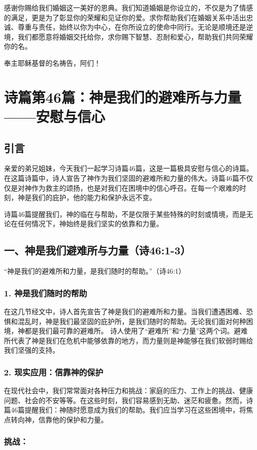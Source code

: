 \documentclass[a4paper, 12pt]{article}
\begin{document}
感谢你赐给我们婚姻这一美好的恩典。我们知道婚姻是你设立的，不仅是为了情感的满足，更是为了彰显你的荣耀和见证你的爱。求你帮助我们在婚姻关系中活出忠诚、尊重与责任，始终以你为中心，在你所设立的使命中同行。无论是顺境还是逆境，我们都愿意将婚姻交托给你，求你赐下智慧、忍耐和爱心，帮助我们共同荣耀你的名。

奉主耶稣基督的名祷告，阿们！
\newpage
\section{诗篇第46篇：神是我们的避难所与力量——安慰与信心}
\subsection*{引言}
\hspace{0.6cm}亲爱的弟兄姐妹，今天我们一起学习诗篇46篇，这是一篇极具安慰与信心的诗篇。在这篇诗篇中，诗人宣告了神作为我们坚固的避难所和力量的伟大。诗篇46篇不仅仅是对神作为救主的颂扬，也是对我们在困境中的信心呼召。在每一个艰难的时刻，神是我们的庇护，他的能力和保护永远不变。

诗篇46篇提醒我们，神的临在与帮助，不是仅限于某些特殊的时刻或情境，而是无论在任何情况下，神始终是我们坚实的依靠和力量。
\subsection*{一、神是我们避难所与力量（诗46:1-3）}
“神是我们的避难所和力量，是我们随时的帮助。”（诗46:1）

\subsubsection*{1. 神是我们随时的帮助}
在这几节经文中，诗人首先宣告了神是我们的避难所和力量。当我们遭遇困难、恐惧和混乱时，神是我们最坚固的庇护所，是我们随时的帮助。无论我们面对何种困境，神都是我们最可靠的避难所。
诗人使用了“避难所”和“力量”这两个词。避难所代表了神是我们在危机中能够依靠的地方，而力量则是神能够在我们软弱时赐给我们坚强的支持。
\subsubsection*{2. 现实应用：信靠神的保护}
在现代社会中，我们常常面对各种压力和挑战：家庭的压力、工作上的挑战、健康问题、社会的不安等等。在这些时刻，我们容易感到无助、迷茫和疲惫。然而，诗篇46篇提醒我们：神随时愿意成为我们的帮助。我们应当学习在这些困境中，将焦点转向神，信靠他的保护和力量。
\subsubsection*{挑战：}
\end{document}
